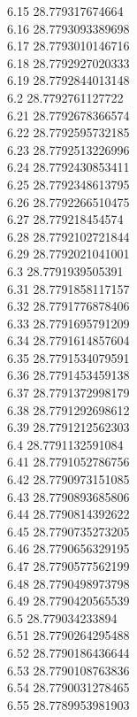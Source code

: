 {6.15	28.779317674664\\
6.16	28.7793093389698\\
6.17	28.7793010146716\\
6.18	28.7792927020333\\
6.19	28.7792844013148\\
6.2	28.7792761127722\\
6.21	28.7792678366574\\
6.22	28.7792595732185\\
6.23	28.7792513226996\\
6.24	28.7792430853411\\
6.25	28.7792348613795\\
6.26	28.7792266510475\\
6.27	28.779218454574\\
6.28	28.7792102721844\\
6.29	28.7792021041001\\
6.3	28.7791939505391\\
6.31	28.7791858117157\\
6.32	28.7791776878406\\
6.33	28.7791695791209\\
6.34	28.7791614857604\\
6.35	28.7791534079591\\
6.36	28.7791453459138\\
6.37	28.7791372998179\\
6.38	28.7791292698612\\
6.39	28.7791212562303\\
6.4	28.7791132591084\\
6.41	28.7791052786756\\
6.42	28.7790973151085\\
6.43	28.7790893685806\\
6.44	28.7790814392622\\
6.45	28.7790735273205\\
6.46	28.7790656329195\\
6.47	28.7790577562199\\
6.48	28.7790498973798\\
6.49	28.7790420565539\\
6.5	28.779034233894\\
6.51	28.7790264295488\\
6.52	28.7790186436644\\
6.53	28.7790108763836\\
6.54	28.7790031278465\\
6.55	28.7789953981903\\
}
